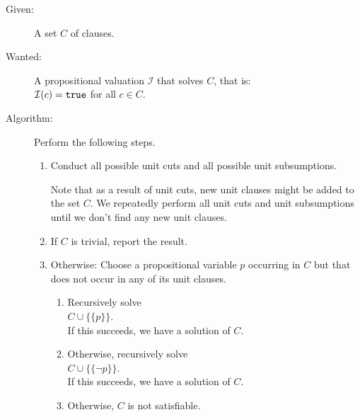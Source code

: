 \begin{description}
\item[Given:]  A set $C$ of clauses.
\item[Wanted:] A propositional valuation $\mathcal{I}$ that solves $C$, that is: 
     \\[0.2cm]
     \hspace*{1.3cm}
     $\mathcal{I}(c) = \mathtt{true}$ \quad for all $c \in C$.
\item[Algorithm:] Perform the following steps.
     \begin{enumerate}
     \item Conduct all possible unit cuts and all possible unit subsumptions.

           Note that as a result of unit cuts, new unit clauses might be added
           to the set $C$.  We repeatedly perform all unit cuts and unit subsumptions
           until we don't find any new unit clauses.
     \item If $C$ is trivial, report the result.
     \item Otherwise: Choose a propositional variable $p$ occurring in $C$ but that
           does not occur in any of its unit clauses.
      \begin{enumerate}
      \item Recursively solve \\[0.2cm]
            \hspace*{1.3cm}  $C \cup \bigl\{\{p\}\bigr\}$.
             \\[0.2cm]
            If this succeeds, we have a solution of $C$.
      \item Otherwise, recursively solve \\[0.2cm]
            \hspace*{1.3cm} $C \cup \bigl\{\{\neg p\}\bigr\}$. \\[0.2cm]
            If this succeeds, we have a solution of $C$. 
      \item Otherwise,  $C$ is not satisfiable.
      \end{enumerate}
\end{enumerate}
\end{description}

